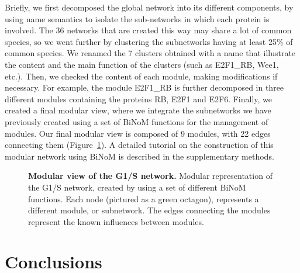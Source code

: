 \documentclass[10pt]{bmc_article}
\newenvironment{bmcformat}{\baselineskip20pt\sloppy\setboolean{publ}{false}}{\baselineskip20pt\sloppy}
\begin{document}
\begin{bmcformat}
Briefly, we first decomposed the global network into its different components,
by using name semantics to isolate the sub-networks in which
each protein is involved. The 36 networks that are created this way may share a
lot of common species, so we went further
by clustering the subnetworks having at least 25\% of common species. We renamed
the 7 clusters obtained with a name that illustrate the content and the main
function of the clusters (such as E2F1\_RB, Wee1, etc.). Then, we checked the
content of each module, making modifications if necessary. For example, the
module E2F1\_RB is
further decomposed in three different modules containing the proteins RB, E2F1
and E2F6. Finally, we created a final modular view, where we integrate the
subnetworks we have previously created using a set of BiNoM functions for the
management of modules. Our final modular view is composed of 9 modules, with 22
edges connecting them (Figure~\ref{g1smodular}). A detailed tutorial on the construction of
this modular network using BiNoM is described in the supplementary methods.


\begin{figure}[h]
 \caption{\label{g1smodular}  \textbf{Modular view of the G1/S network.}
	Modular representation of the G1/S network, created by using a set of
different BiNoM functions. Each node (pictured as a green octagon), represents a
different module, or subnetwork. The edges connecting the modules represent the
 known influences between modules. }
\end{figure}


\section*{Conclusions}


\end{bmcformat}
\end{document}
